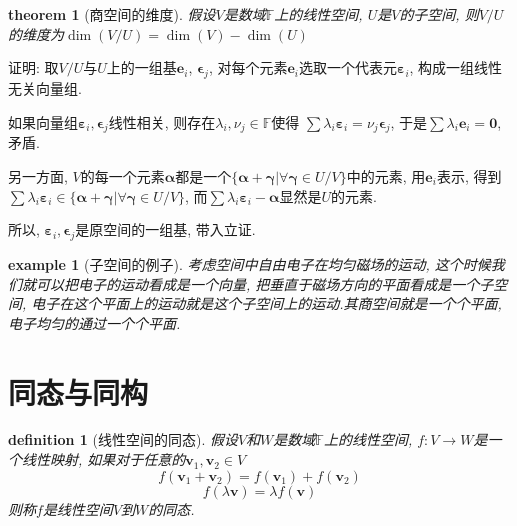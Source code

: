 \documentclass[12pt]{ctexbook}
\newtheorem{definition}{definition}
\numberwithin{definition}{section}
\newtheorem{theorem}{theorem}
\numberwithin{theorem}{section}
\numberwithin{exercise}{section}
\newtheorem{example}{example}
\numberwithin{example}{section}
\numberwithin{lemma}{section}
\begin{document}
    \begin{theorem}
        [商空间的维度] 假设\(V\)是数域\(\mathbb{F}\)上的线性空间, \(U\)是\(V\)的子空间, 则\(V/U\)的维度为\(\dim(V/U) = \dim(V) - \dim(U)\)
    \end{theorem}

    证明: 取\(V/U\)与\(U\)上的一组基\(\boldsymbol{e}_i\), \(\boldsymbol{\epsilon}_j\), 
    对每个元素\(\boldsymbol{e}_i\)选取一个代表元\(\boldsymbol{\varepsilon}_i\), 构成一组线性无关向量组.

    如果向量组\(\boldsymbol{\varepsilon}_i,\boldsymbol{\epsilon}_j\)线性相关, 则存在\(\lambda_i, \nu_j \in \mathbb{F}\)使得
    \(\sum \lambda_i \boldsymbol{\varepsilon}_i = \nu_j \boldsymbol{\epsilon}_j\), 于是\(\sum \lambda_i \boldsymbol{e}_i = \boldsymbol{0}\), 矛盾.

    另一方面, \(V\)的每一个元素\(\boldsymbol{\alpha}\)都是一个\(\{\boldsymbol{\alpha} + \boldsymbol{\gamma} | \forall \boldsymbol{\gamma} \in U/V\}\)中的元素, 
    用\(\boldsymbol{e}_i\)表示, 得到\(\sum \lambda_i \boldsymbol{\varepsilon}_i \in \{\boldsymbol{\alpha} + \boldsymbol{\gamma} | \forall \boldsymbol{\gamma} \in U/V\}\),
    而\(\sum \lambda_i \boldsymbol{\varepsilon}_i - \boldsymbol{\alpha}\)显然是\(U\)的元素.

    所以, \(\boldsymbol{\varepsilon}_i, \boldsymbol{\epsilon}_j\)是原空间的一组基, 带入立证.

    \begin{example}
        [子空间的例子] 考虑空间中自由电子在均匀磁场的运动, 这个时候我们就可以把电子的运动看成是一个向量,
        把垂直于磁场方向的平面看成是一个子空间, 电子在这个平面上的运动就是这个子空间上的运动.其商空间就是一个个平面,
        电子均匀的通过一个个平面.
    \end{example}

    \section{同态与同构}

    \begin{definition}
        [线性空间的同态] 假设\(V\)和\(W\)是数域\(\mathbb{F}\)上的线性空间, \(f: V \rightarrow W\)是一个线性映射, 如果对于任意的\(\boldsymbol{v}_1, \boldsymbol{v}_2 \in V\)
        \begin{equation}
            f(\boldsymbol{v}_1 + \boldsymbol{v}_2) = f(\boldsymbol{v}_1) + f(\boldsymbol{v}_2)
        \end{equation}
        \begin{equation}
            f(\lambda \boldsymbol{v}) = \lambda f(\boldsymbol{v})
        \end{equation}
        则称\(f\)是线性空间\(V\)到\(W\)的同态.
    \end{definition}
\end{document}
